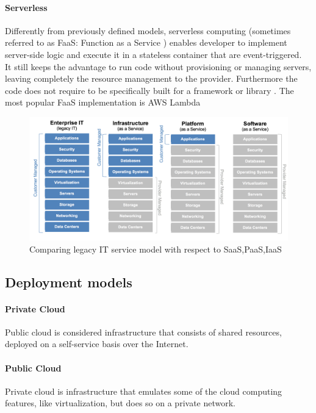 \paragraph{Serverless}
\label{paragraph:Serverless}
Differently from previously defined models, serverless computing (sometimes referred to as FaaS: Function as a Service \cite{serverless_computing}) enables developer to implement server-side logic and execute it in a stateless container that are event-triggered.\\
It still keeps the advantage to run code without provisioning or managing servers, leaving completely the resource management to the provider.
Furthermore the code does not require to be specifically built for a framework or library \cite{martin_serverless}.
The most popular FaaS implementation is AWS Lambda

\begin{figure}[h]
    \centering
    \includegraphics[width=\textwidth,keepaspectratio]{img/saas_paas_iaas}
    \caption{Comparing legacy IT service model with respect to SaaS,PaaS,IaaS}
    \label{fig:saas_paas_iaas}
\end{figure}

\subsection{Deployment models}
\paragraph{Private Cloud}
\label{paragraph:Private Cloud}
Public cloud is considered infrastructure that consists of shared resources, deployed on a self-service basis over the Internet.
\paragraph{Public Cloud}
\label{paragraph:Public Cloud}
Private cloud is infrastructure that emulates some of the cloud computing features, like virtualization, but does so on a private network.
